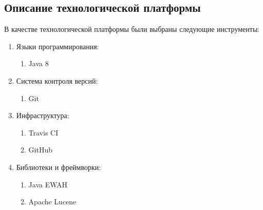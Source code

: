 \documentclass{matmex-diploma}
\begin{document}
    \subsection{Описание технологической платформы}
        В качестве технологической платформы были выбраны следующие инструменты:
        \begin{enumerate}
            \item Языки программирования:
                \begin{enumerate}
                    \item Java 8
                \end{enumerate}
            \item Система контроля версий:
                \begin{enumerate}
                    \item Git
                \end{enumerate}
            \item Инфраструктура:
                \begin{enumerate}
                    \item Travis CI
                    \item GitHub
                \end{enumerate}
            \item Библиотеки и фреймворки:
                \begin{enumerate}
                    \item Java EWAH
                    \item Apache Lucene
                \end{enumerate}    
        \end{enumerate}
        
\end{document}
